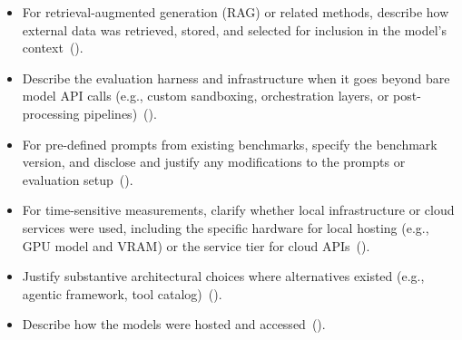 \begin{itemize}[label={},leftmargin=*]
    \item \iconM {} For retrieval-augmented generation (RAG) or related methods, describe how external data was retrieved, stored, and selected for inclusion in the model's context~().
    \item \iconM {} Describe the evaluation harness and infrastructure when it goes beyond bare model API calls (e.g., custom sandboxing, orchestration layers, or post-processing pipelines)~().
    \item \iconM {} For pre-defined prompts from existing benchmarks, specify the benchmark version, and disclose and justify any modifications to the prompts or evaluation setup~().
    \item \iconM {} For time-sensitive measurements, clarify whether local infrastructure or cloud services were used, including the specific hardware for local hosting (e.g., GPU model and VRAM) or the service tier for cloud APIs~().
    \item \iconS Justify substantive architectural choices where alternatives existed (e.g., agentic framework, tool catalog)~().
    \item \iconS Describe how the models were hosted and accessed~().

\end{itemize}
